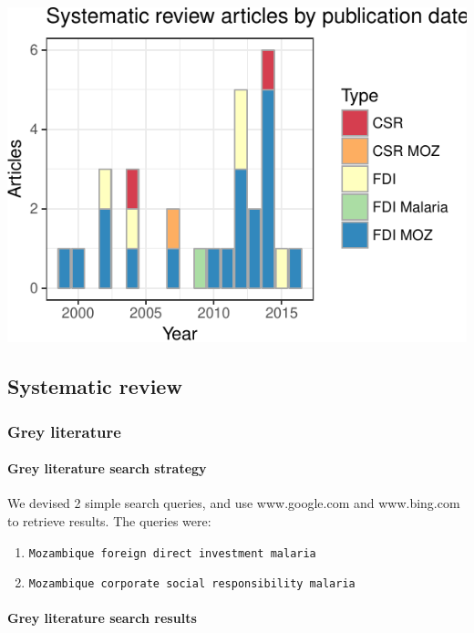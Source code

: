 \documentclass[]{elsarticle} %
\providecommand{\tightlist}{%
  \setlength{\itemsep}{0pt}\setlength{\parskip}{0pt}}
\begin{document}
\begin{center}\includegraphics{paper_files/figure-latex/unnamed-chunk-15-1} \end{center}

\subsection{Systematic review}\label{systematic-review-1}

\subsubsection{Grey literature}\label{grey-literature-1}

\paragraph{Grey literature search
strategy}\label{grey-literature-search-strategy}

We devised 2 simple search queries, and use www.google.com and
www.bing.com to retrieve results. The queries were:

\begin{enumerate}
\def\labelenumi{\arabic{enumi}.}
\tightlist
\item
  \texttt{Mozambique\ foreign\ direct\ investment\ malaria}
\item
  \texttt{Mozambique\ corporate\ social\ responsibility\ malaria}
\end{enumerate}

\paragraph{Grey literature search
results}\label{grey-literature-search-results}
\end{document}
